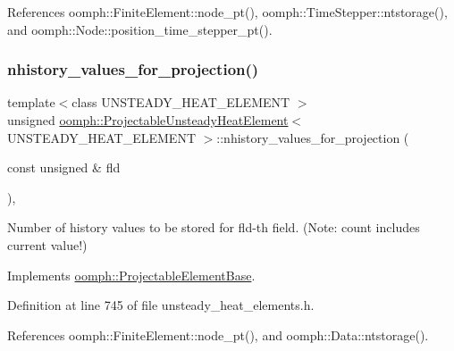 References oomph\+::\+Finite\+Element\+::node\+\_\+pt(), oomph\+::\+Time\+Stepper\+::ntstorage(), and oomph\+::\+Node\+::position\+\_\+time\+\_\+stepper\+\_\+pt().

\mbox{\label{classoomph_1_1ProjectableUnsteadyHeatElement_ac26bb5fe73e07db80e7e4e7a2070074c}} 
\subsubsection{\texorpdfstring{nhistory\+\_\+values\+\_\+for\+\_\+projection()}{nhistory\_values\_for\_projection()}}
{\footnotesize\ttfamily template$<$class U\+N\+S\+T\+E\+A\+D\+Y\+\_\+\+H\+E\+A\+T\+\_\+\+E\+L\+E\+M\+E\+NT $>$ \\
unsigned \hyperlink{classoomph_1_1ProjectableUnsteadyHeatElement}{oomph\+::\+Projectable\+Unsteady\+Heat\+Element}$<$ U\+N\+S\+T\+E\+A\+D\+Y\+\_\+\+H\+E\+A\+T\+\_\+\+E\+L\+E\+M\+E\+NT $>$\+::nhistory\+\_\+values\+\_\+for\+\_\+projection (\begin{DoxyParamCaption}\item[{const unsigned \&}]{fld }\end{DoxyParamCaption})\hspace{0.3cm}{\ttfamily [inline]}, {\ttfamily [virtual]}}



Number of history values to be stored for fld-\/th field. (Note\+: count includes current value!) 



Implements \hyperlink{classoomph_1_1ProjectableElementBase_ac6790f394630b964663281f8740f43a5}{oomph\+::\+Projectable\+Element\+Base}.



Definition at line 745 of file unsteady\+\_\+heat\+\_\+elements.\+h.



References oomph\+::\+Finite\+Element\+::node\+\_\+pt(), and oomph\+::\+Data\+::ntstorage().

\mbox{\label{classoomph_1_1ProjectableUnsteadyHeatElement_aa15defb47cb015dc9c589606addfdd61}} 
